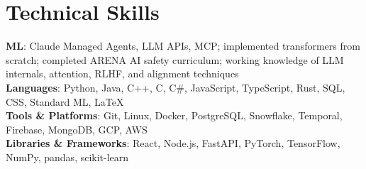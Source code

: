 \documentclass[letterpaper,11pt]{article}
\begin{document}
\section{Technical Skills}
 \begin{itemize}[leftmargin=0.15in, label={}]
    \small{\item{
     \textbf{ML}{: Claude Managed Agents, LLM APIs, MCP; implemented transformers from scratch; completed ARENA AI safety curriculum; working knowledge of LLM internals, attention, RLHF, and alignment techniques} \\
     \textbf{Languages}{: Python, Java, C++, C, C\#, JavaScript, TypeScript, Rust, SQL, CSS, Standard ML, \LaTeX} \\
     \textbf{Tools \& Platforms}{: Git, Linux, Docker, PostgreSQL, Snowflake, Temporal, Firebase, MongoDB, GCP, AWS} \\
     \textbf{Libraries \& Frameworks}{: React, Node.js, FastAPI, PyTorch, TensorFlow, NumPy, pandas, scikit-learn}
    }}
 \end{itemize}


\end{document}
